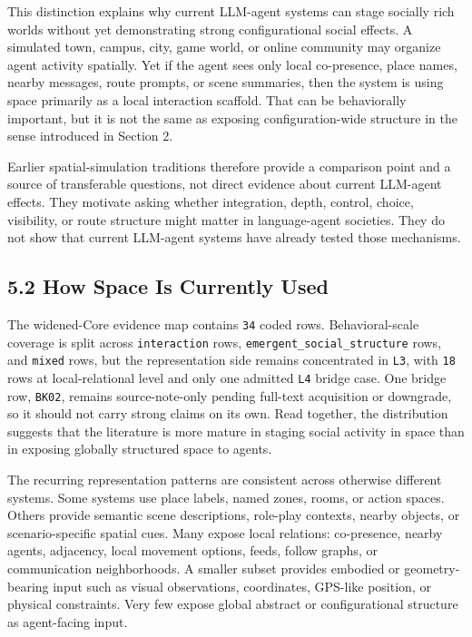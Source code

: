 \documentclass[
  twocolumn]{article}
\begin{document}
This distinction explains why current LLM-agent systems can stage
socially rich worlds without yet demonstrating strong configurational
social effects. A simulated town, campus, city, game world, or online
community may organize agent activity spatially. Yet if the agent sees
only local co-presence, place names, nearby messages, route prompts, or
scene summaries, then the system is using space primarily as a local
interaction scaffold. That can be behaviorally important, but it is not
the same as exposing configuration-wide structure in the sense
introduced in Section 2.

Earlier spatial-simulation traditions therefore provide a comparison
point and a source of transferable questions, not direct evidence about
current LLM-agent effects. They motivate asking whether integration,
depth, control, choice, visibility, or route structure might matter in
language-agent societies. They do not show that current LLM-agent
systems have already tested those mechanisms.

\subsection{5.2 How Space Is Currently
Used}\label{how-space-is-currently-used}

The widened-Core evidence map contains \texttt{34} coded rows.
Behavioral-scale coverage is split across \texttt{interaction} rows,
\texttt{emergent\_social\_structure} rows, and \texttt{mixed} rows, but
the representation side remains concentrated in \texttt{L3}, with
\texttt{18} rows at local-relational level and only one admitted
\texttt{L4} bridge case. One bridge row, \texttt{BK02}, remains
source-note-only pending full-text acquisition or downgrade, so it
should not carry strong claims on its own. Read together, the
distribution suggests that the literature is more mature in staging
social activity in space than in exposing globally structured space to
agents.

The recurring representation patterns are consistent across otherwise
different systems. Some systems use place labels, named zones, rooms, or
action spaces. Others provide semantic scene descriptions, role-play
contexts, nearby objects, or scenario-specific spatial cues. Many expose
local relations: co-presence, nearby agents, adjacency, local movement
options, feeds, follow graphs, or communication neighborhoods. A smaller
subset provides embodied or geometry-bearing input such as visual
observations, coordinates, GPS-like position, or physical constraints.
Very few expose global abstract or configurational structure as
agent-facing input.
\end{document}
